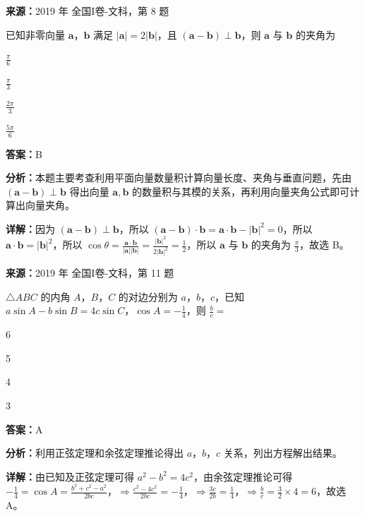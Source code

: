 \begin{question}[points=5]
\textbf{来源：}2019 年 全国I卷-文科，第 8 题\par
已知非零向量 $\boldsymbol{a}$，$\boldsymbol{b}$ 满足 $|\boldsymbol{a}|=2|\boldsymbol{b}|$，且 $(\boldsymbol{a}-\boldsymbol{b}) \perp \boldsymbol{b}$，则 $\boldsymbol{a}$ 与 $\boldsymbol{b}$ 的夹角为
\begin{choices}
  \item $\frac{\pi}{6}$
  \item $\frac{\pi}{3}$
  \item $\frac{2\pi}{3}$
  \item $\frac{5\pi}{6}$
\end{choices}
\begin{solution}
\textbf{答案：}B

\textbf{分析：}本题主要考查利用平面向量数量积计算向量长度、夹角与垂直问题，先由 $(\boldsymbol{a}-\boldsymbol{b}) \perp \boldsymbol{b}$ 得出向量 $\boldsymbol{a},\boldsymbol{b}$ 的数量积与其模的关系，再利用向量夹角公式即可计算出向量夹角。

\textbf{详解：}因为 $(\boldsymbol{a}-\boldsymbol{b}) \perp \boldsymbol{b}$，所以 $(\boldsymbol{a}-\boldsymbol{b})\cdot\boldsymbol{b} = \boldsymbol{a}\cdot\boldsymbol{b} - |\boldsymbol{b}|^2 = 0$，所以 $\boldsymbol{a}\cdot\boldsymbol{b} = |\boldsymbol{b}|^2$，所以 $\cos\theta = \frac{\boldsymbol{a}\cdot\boldsymbol{b}}{|\boldsymbol{a}||\boldsymbol{b}|} = \frac{|\boldsymbol{b}|^2}{2|\boldsymbol{b}|^2} = \frac{1}{2}$，所以 $\boldsymbol{a}$ 与 $\boldsymbol{b}$ 的夹角为 $\frac{\pi}{3}$，故选 B。
\end{solution}
\end{question}

\begin{question}[points=5]
\textbf{来源：}2019 年 全国I卷-文科，第 11 题\par
$\triangle ABC$ 的内角 $A$，$B$，$C$ 的对边分别为 $a$，$b$，$c$，已知 $a\sin A - b\sin B = 4c\sin C$，$\cos A = -\frac{1}{4}$，则 $\frac{b}{c} =$
\begin{choices}
  \item 6
  \item 5
  \item 4
  \item 3
\end{choices}
\begin{solution}
\textbf{答案：}A

\textbf{分析：}利用正弦定理和余弦定理推论得出 $a$，$b$，$c$ 关系，列出方程解出结果。

\textbf{详解：}由已知及正弦定理可得 $a^2 - b^2 = 4c^2$，由余弦定理推论可得 $-\frac{1}{4} = \cos A = \frac{b^2+c^2-a^2}{2bc}$，$\Rightarrow \frac{c^2-4c^2}{2bc} = -\frac{1}{4}$，$\Rightarrow \frac{3c}{2b} = \frac{1}{4}$，$\Rightarrow \frac{b}{c} = \frac{3}{2} \times 4 = 6$，故选 A。
\end{solution}
\end{question}

